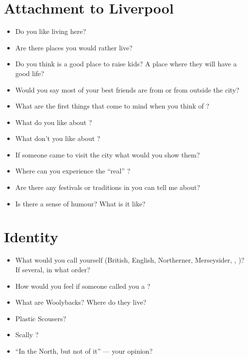 	\section*{Attachment to Liverpool}
	\begin{multicols}{2}
		\begin{itemize}
			\item Do you like living here?
			\item Are there places you would rather live?
			\item Do you think  is a good place to raise kids? A place where they will have a good life?
			\item Would you say most of your best friends are from  or from outside the city?
			\item What are the first things that come to mind when you think of ?
			\item What do you like about ?
			\item What don't you like about ?
			\item If someone came to visit the city what would you show them?
			\item Where can you experience the \enquote{real} ?
			\item Are there any festivals or traditions in  you can tell me about?
			\item Is there a  sense of humour? What is it like?
		\end{itemize}
	\end{multicols}
	
	\section*{Identity}
	\begin{multicols}{2}
		\begin{itemize}
			\item What would you call yourself (British, English, Northerner, Merseysider, , )? If several, in what order?
			\item How would you feel if someone called you a ?
			\item What are Woolybacks? Where do they live?
			\item Plastic Scousers?
			\item Scally ?
			\item ``In the North, but not of it'' --- your opinion?
		\end{itemize}
	\end{multicols}
	
